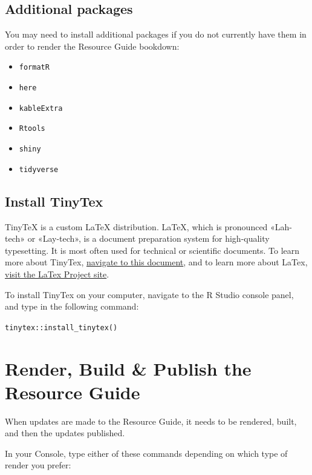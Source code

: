 \documentclass[
]{book}
\providecommand{\tightlist}{%
  \setlength{\itemsep}{0pt}\setlength{\parskip}{0pt}}
\begin{document}
\hypertarget{additional-packages}{%
\subsection{Additional packages}\label{additional-packages}}

You may need to install additional packages if you do not currently have them in order to render the Resource Guide bookdown:

\begin{itemize}
\tightlist
\item
  \texttt{formatR}
\item
  \texttt{here}
\item
  \texttt{kableExtra}
\item
  \texttt{Rtools}
\item
  \texttt{shiny}
\item
  \texttt{tidyverse}
\end{itemize}

\hypertarget{install-tinytex}{%
\subsection{Install TinyTex}\label{install-tinytex}}

TinyTeX is a custom LaTeX distribution. LaTeX, which is pronounced «Lah-tech» or «Lay-tech», is a document preparation system for high-quality typesetting. It is most often used for technical or scientific documents. To learn more about TinyTex, \href{https://yihui.org/tinytex/}{navigate to this document}, and to learn more about LaTex, \href{https://www.latex-project.org/}{visit the LaTex Project site}.

To install TinyTex on your computer, navigate to the R Studio console panel, and type in the following command:

\texttt{tinytex::install\_tinytex()}

\hypertarget{render-build-publish-the-resource-guide}{%
\section{Render, Build \& Publish the Resource Guide}\label{render-build-publish-the-resource-guide}}

When updates are made to the Resource Guide, it needs to be rendered, built, and then the updates published.

In your Console, type either of these commands depending on which type of render you prefer:
\end{document}
